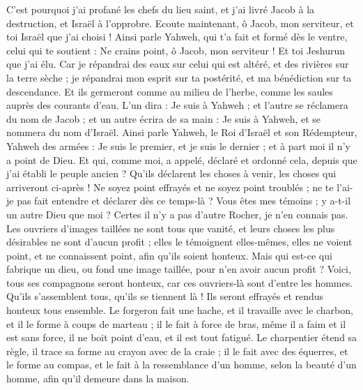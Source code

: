 \begin{multicols}{2}
C'est pourquoi j'ai profané les chefs du lieu saint, et j'ai livré Jacob à la destruction, et Israël à l'opprobre.
\VerseOne{}Ecoute maintenant, ô Jacob, mon serviteur, et toi Israël que j'ai choisi !
Ainsi parle Yahweh, qui t'a fait et formé dès le ventre, celui qui te soutient : Ne crains point, ô Jacob, mon serviteur ! Et toi Jeshurun que j'ai élu.
Car je répandrai des eaux sur celui qui est altéré, et des rivières sur la terre sèche ; je répandrai mon esprit sur ta postérité, et ma bénédiction sur ta descendance.
Et ils germeront comme au milieu de l'herbe, comme les saules auprès des courants d'eau.
L'un dira : Je suis à Yahweh ; et l'autre se réclamera du nom de Jacob ; et un autre écrira de sa main : Je suis à Yahweh, et se nommera du nom d'Israël.
Ainsi parle Yahweh, le Roi d'Israël et son Rédempteur, Yahweh des armées : Je suis le premier, et je suis le dernier ; et à part moi il n'y a point de Dieu.
Et qui, comme moi, a appelé, déclaré et ordonné cela, depuis que j'ai établi le peuple ancien ? Qu'ils déclarent les choses à venir, les choses qui arriveront ci-après !
Ne soyez point effrayés et ne soyez point troublés ; ne te l'ai-je pas fait entendre et déclarer dès ce temps-là ? Vous êtes mes témoins ; y a-t-il un autre Dieu que moi ? Certes il n'y a pas d'autre Rocher, je n'en connais pas.
Les ouvriers d'images taillées ne sont tous que vanité, et leurs choses les plus désirables ne sont d'aucun profit ; elles le témoignent elles-mêmes, elles ne voient point, et ne connaissent point, afin qu'ils soient honteux.
Mais qui est-ce qui fabrique un dieu, ou fond une image taillée, pour n'en avoir aucun profit ?
Voici, tous ses compagnons seront honteux, car ces ouvriers-là sont d'entre les hommes. Qu'ils s'assemblent tous, qu'ils se tiennent là ! Ils seront effrayés et rendus honteux tous ensemble.
Le forgeron fait une hache, et il travaille avec le charbon, et il le forme à coups de marteau ; il le fait à force de bras, même il a faim et il est sans force, il ne boit point d'eau, et il est tout fatigué.
Le charpentier étend sa règle, il trace sa forme au crayon avec de la craie ; il le fait avec des équerres, et le forme au compas, et le fait à la ressemblance d'un homme, selon la beauté d'un homme, afin qu'il demeure dans la maison.

\end{multicols}
